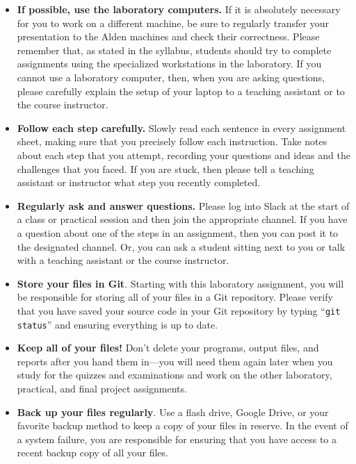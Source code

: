 \vspace*{-.1in}
\begin{itemize}
  \setlength{\itemsep}{-.01in}

\item {\bf If possible, use the laboratory computers.} If it is absolutely necessary for you to work on a different
  machine, be sure to regularly transfer your presentation to the Alden machines and check their correctness. Please
  remember that, as stated in the syllabus, students should try to complete assignments using the specialized
  workstations in the laboratory. If you cannot use a laboratory computer, then, when you are asking questions, please
  carefully explain the setup of your laptop to a teaching assistant or to the course instructor.

\item {\bf Follow each step carefully.} Slowly read each sentence in every assignment sheet, making sure that you
  precisely follow each instruction. Take notes about each step that you attempt, recording your questions and ideas
  and the challenges that you faced. If you are stuck, then please tell a teaching assistant or instructor what step
  you recently completed.

\item {\bf Regularly ask and answer questions.} Please log into Slack at the start of a class or practical session and
  then join the appropriate channel. If you have a question about one of the steps in an assignment, then you can post
  it to the designated channel. Or, you can ask a student sitting next to you or talk with a teaching assistant or the
  course instructor.

\item {\bf Store your files in Git}. Starting with this laboratory assignment, you will be responsible for storing all
  of your files in a Git repository. Please verify that you have saved your source code in your Git repository by
  typing ``{\tt git status}'' and ensuring everything is up to date.

\item {\bf Keep all of your files!} Don't delete your programs, output files, and reports after you hand them in---you
  will need them again later when you study for the quizzes and examinations and work on the other laboratory,
  practical, and final project assignments.

\item {\bf Back up your files regularly}. Use a flash drive, Google Drive, or your favorite backup method to keep a
  copy of your files in reserve. In the event of a system failure, you are responsible for ensuring that you have
  access to a recent backup copy of all your files.

\end{itemize}

